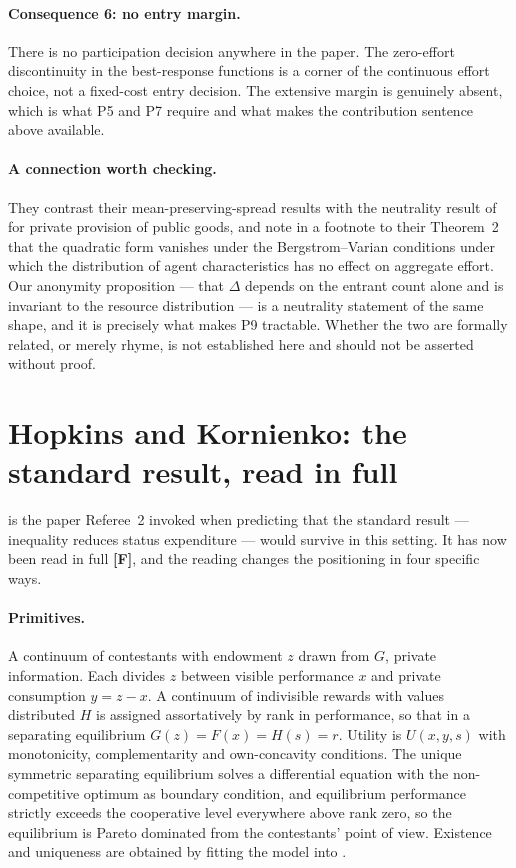 \documentclass[11pt,a4paper]{article}
\begin{document}
\paragraph{Consequence 6: no entry margin.} There is no participation decision
anywhere in the paper. The zero-effort discontinuity in the best-response
functions is a corner of the continuous effort choice, not a fixed-cost entry
decision. The extensive margin is genuinely absent, which is what P5 and P7
require and what makes the contribution sentence above available.

\paragraph{A connection worth checking.} They contrast their
mean-preserving-spread results with the neutrality result of
\citet{BergstromBlumeVarian1986} for private provision of public goods, and note
in a footnote to their Theorem~2 that the quadratic form vanishes under the
Bergstrom--Varian conditions under which the distribution of agent
characteristics has no effect on aggregate effort. Our anonymity proposition ---
that $\Delta$ depends on the entrant count alone and is invariant to the
resource distribution --- is a neutrality statement of the same shape, and it is
precisely what makes P9 tractable. Whether the two are formally related, or
merely rhyme, is not established here and should not be asserted without proof.

\section{Hopkins and Kornienko: the standard result, read in full}
\label{sec:hk}

\citet{HopkinsKornienko2010} is the paper Referee~2 invoked when predicting that
the standard result --- inequality reduces status expenditure --- would survive
in this setting. It has now been read in full \textbf{[F]}, and the reading
changes the positioning in four specific ways.

\paragraph{Primitives.} A continuum of contestants with endowment $z$ drawn from
$G$, private information. Each divides $z$ between visible performance $x$ and
private consumption $y = z - x$. A continuum of indivisible rewards with values
distributed $H$ is assigned assortatively by rank in performance, so that in a
separating equilibrium $G(z) = F(x) = H(s) = r$. Utility is $U(x, y, s)$ with
monotonicity, complementarity and own-concavity conditions. The unique symmetric
separating equilibrium solves a differential equation with the non-competitive
optimum as boundary condition, and equilibrium performance strictly exceeds the
cooperative level everywhere above rank zero, so the equilibrium is Pareto
dominated from the contestants' point of view. Existence and uniqueness are
obtained by fitting the model into \citet{Mailath1987}.
\end{document}
